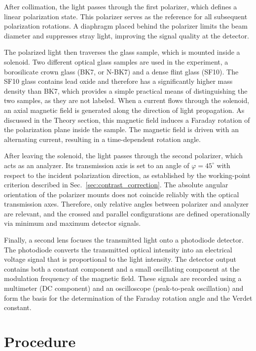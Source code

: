\documentclass[a4paper]{article}
\begin{document}
After collimation, the light passes through the first polarizer, which defines a linear polarization state.
This polarizer serves as the reference for all subsequent polarization rotations.
A diaphragm placed behind the polarizer limits the beam diameter and suppresses stray light, improving the signal quality at the detector.

The polarized light then traverses the glass sample, which is mounted inside a solenoid.
Two different optical glass samples are used in the experiment, a borosilicate crown glass (BK7, or N-BK7) and a dense flint glass (SF10).
The SF10 glass contains lead oxide and therefore has a significantly higher mass density than BK7, which provides a simple practical means of distinguishing the two samples, as they are not labeled.
When a current flows through the solenoid, an axial magnetic field is generated along the direction of light propagation.
As discussed in the Theory section, this magnetic field induces a Faraday rotation of the polarization plane inside the sample.
The magnetic field is driven with an alternating current, resulting in a time-dependent rotation angle.

After leaving the solenoid, the light passes through the second polarizer, which acts as an analyzer.
Its transmission axis is set to an angle of $\varphi = 45^\circ$ with respect to the incident polarization direction, as established by the working-point criterion described in Sec.~\ref{sec:contrast_correction}.
The absolute angular orientation of the polarizer mounts does not coincide reliably with the optical transmission axes.
Therefore, only relative angles between polarizer and analyzer are relevant, and the crossed and parallel configurations are defined operationally via minimum and maximum detector signals.

Finally, a second lens focuses the transmitted light onto a photodiode detector.
The photodiode converts the transmitted optical intensity into an electrical voltage signal that is proportional to the light intensity.
The detector output contains both a constant component and a small oscillating component at the modulation frequency of the magnetic field.
These signals are recorded using a multimeter (DC component) and an oscilloscope (peak-to-peak oscillation) and form the basis for the determination of the Faraday rotation angle and the Verdet constant.

\section{Procedure}
\end{document}
